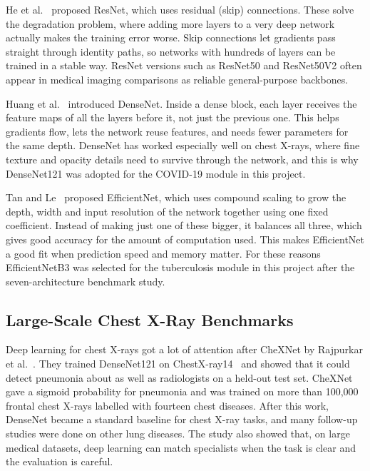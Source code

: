 He et al.~\cite{he2016} proposed ResNet, which uses residual (skip) connections. These solve the degradation problem, where adding more layers to a very deep network actually makes the training error worse. Skip connections let gradients pass straight through identity paths, so networks with hundreds of layers can be trained in a stable way. ResNet versions such as ResNet50 and ResNet50V2 often appear in medical imaging comparisons as reliable general-purpose backbones.

Huang et al.~\cite{huang2017} introduced DenseNet. Inside a dense block, each layer receives the feature maps of all the layers before it, not just the previous one. This helps gradients flow, lets the network reuse features, and needs fewer parameters for the same depth. DenseNet has worked especially well on chest X-rays, where fine texture and opacity details need to survive through the network, and this is why DenseNet121 was adopted for the COVID-19 module in this project.

Tan and Le~\cite{tan2019} proposed EfficientNet, which uses compound scaling to grow the depth, width and input resolution of the network together using one fixed coefficient. Instead of making just one of these bigger, it balances all three, which gives good accuracy for the amount of computation used. This makes EfficientNet a good fit when prediction speed and memory matter. For these reasons EfficientNetB3 was selected for the tuberculosis module in this project after the seven-architecture benchmark study.

\subsection{Large-Scale Chest X-Ray Benchmarks}

Deep learning for chest X-rays got a lot of attention after CheXNet by Rajpurkar et al.~\cite{rajpurkar2017}. They trained DenseNet121 on ChestX-ray14~\cite{wang2017} and showed that it could detect pneumonia about as well as radiologists on a held-out test set. CheXNet gave a sigmoid probability for pneumonia and was trained on more than 100,000 frontal chest X-rays labelled with fourteen chest diseases. After this work, DenseNet became a standard baseline for chest X-ray tasks, and many follow-up studies were done on other lung diseases. The study also showed that, on large medical datasets, deep learning can match specialists when the task is clear and the evaluation is careful.

